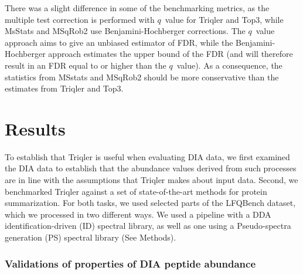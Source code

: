 \documentclass[10pt,letterpaper]{article}
\providecommand{\DIFaddend}{} %
\providecommand{\DIFdelbegin}{} %
\providecommand{\DIFdelend}{} %
\newcommand{\DIFscaledelfig}{0.5}
\newlength{\DIFdelgraphicswidth} %
\newlength{\DIFdelgraphicsheight} %
\newcommand{\DIFdelincludegraphics}[2][]{%
\sbox{\DIFdelgraphicsbox}{\DIFOincludegraphics[#1]{#2}}%
\settoboxwidth{\DIFdelgraphicswidth}{\DIFdelgraphicsbox} %
\settoboxtotalheight{\DIFdelgraphicsheight}{\DIFdelgraphicsbox} %
\scalebox{\DIFscaledelfig}{%
\parbox[b]{\DIFdelgraphicswidth}{\usebox{\DIFdelgraphicsbox}\\[-\baselineskip] \rule{\DIFdelgraphicswidth}{0em}}\llap{\resizebox{\DIFdelgraphicswidth}{\DIFdelgraphicsheight}{%
\setlength{\unitlength}{\DIFdelgraphicswidth}%
\begin{picture}(1,1)%
\thicklines\linethickness{2pt} %
{\color[rgb]{1,0,0}\put(0,0){\framebox(1,1){}}}%
{\color[rgb]{1,0,0}\put(0,0){\line( 1,1){1}}}%
{\color[rgb]{1,0,0}\put(0,1){\line(1,-1){1}}}%
\end{picture}%
}\hspace*{3pt}}} %
} %
\DeclareRobustCommand{\DIFaddend}{\DIFOaddend \let\includegraphics\DIFOincludegraphics} %
\DeclareRobustCommand{\DIFdelbegin}{\DIFOdelbegin \let\includegraphics\DIFdelincludegraphics} %
\DeclareRobustCommand{\DIFdelend}{\DIFOaddend \let\includegraphics\DIFOincludegraphics} %
\begin{document}
\DIFaddend There was a slight difference in some of the benchmarking metrics, as the multiple test correction is performed with $q$~value for Triqler and Top3, while MsStats and MSqRob2 use Benjamini-Hochberger \cite{benjamini1995controlling} corrections. The $q$~value approach aims to give an unbiased estimator of FDR, while the Benjamini-Hochberger approach estimates the upper bound of the FDR (and will therefore result in an FDR equal to or higher than the $q$~value). As a consequence, the statistics from MSstats and MSqRob2 should be more conservative than the estimates from Triqler and Top3\cite{korthauer2019practical}.

\DIFdelbegin %

\DIFdelend \section*{Results}

To establish that Triqler is useful when evaluating DIA data, we first examined the DIA data to establish that the abundance values derived from such processes are in line with the assumptions that Triqler makes about input data. Second, we benchmarked Triqler against a set of state-of-the-art methods for protein summarization. For both tasks, we used selected parts of the LFQBench dataset, which we processed in two different ways. We used a pipeline with a DDA identification-driven (ID) spectral library, as well as one using a Pseudo-spectra generation (PS) spectral library (See Methods).


\subsubsection*{Validations of properties of DIA peptide abundance}
\end{document}
